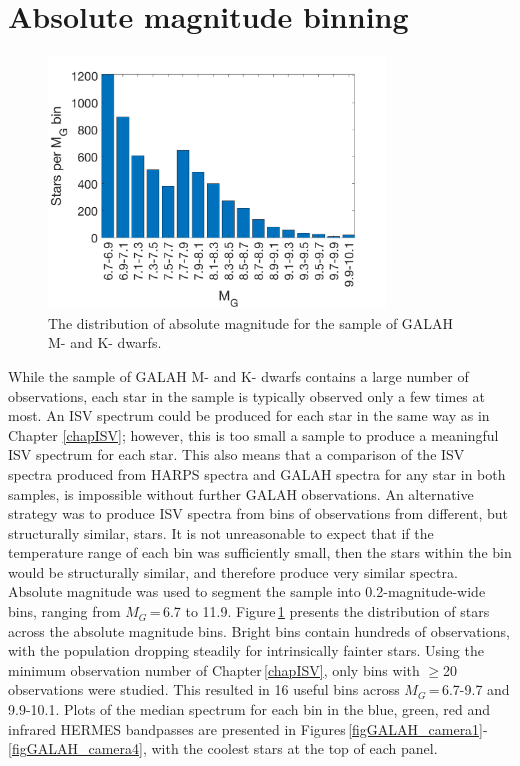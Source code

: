 \section{Absolute magnitude binning}
\label{secGALAHstack}
\begin{figure}
    \centering
    \captionsetup{width=.8\textwidth}
    \includegraphics[width=0.8\textwidth]{GALAH_bin_histogram.png}
    \caption{The distribution of absolute magnitude for the sample of 
    GALAH M- and K- dwarfs.}
    \label{figGALAHhistogram}
\end{figure}

While the sample of GALAH M- and K- dwarfs contains a large number of observations, each star in the sample is typically observed only a few times at most. An ISV spectrum could be produced for each star in the same way as in Chapter \ref{chapISV}; however, this is too small a sample to produce a meaningful ISV spectrum for each star. This also means that a comparison of the ISV spectra produced from HARPS spectra and GALAH spectra for any star in both samples, is impossible without further GALAH observations. An alternative strategy was to produce ISV spectra from bins of observations from different, but structurally similar, stars. It is not unreasonable to expect that if the temperature range of each bin was sufficiently small, then the stars within the bin would be structurally similar, and therefore produce very similar spectra.\\

Absolute magnitude was used to segment the sample into 0.2-magnitude-wide bins, ranging from $M_G$\,=\,6.7 to 11.9. Figure\,\ref{figGALAHhistogram} presents the distribution of stars across the absolute magnitude bins. Bright bins contain hundreds of observations, with the population dropping steadily for intrinsically fainter stars. Using the minimum observation number of Chapter\,\ref{chapISV}, only bins with $\geqslant$20 observations were studied. This resulted in 16 useful bins across $M_G$\,=\,6.7-9.7 and 9.9-10.1. Plots of the median spectrum for each bin in the blue, green, red and infrared HERMES bandpasses are presented in Figures\,\ref{figGALAH_camera1}-\ref{figGALAH_camera4}, with the coolest stars at the top of each panel.\\

